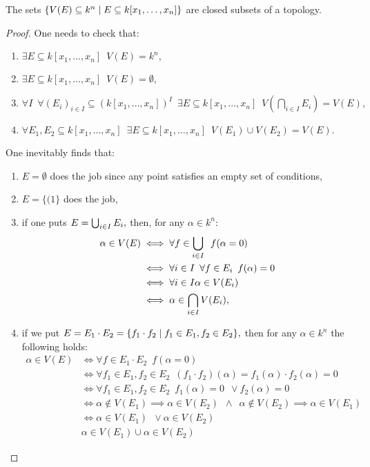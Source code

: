 \begin{lemma}
  \label{zariski algebraic sets}
  The sets
  \(\{V(E) \subseteq k^n \mathrel{|} E \subseteq k[x_1, \dotsc, x_n]\}\)
  are closed subsets of a topology.
\end{lemma}
\begin{proof}
  One needs to check that:
  \begin{enumerate}
  \item \(\exists E \subseteq k[x_1, \dotsc, x_n] \enspace V(E) = k^n,\)
  \item \(\exists E \subseteq k[x_1, \dotsc, x_n] \enspace V(E) = \emptyset,\)
  \item \(\forall I \enspace \forall (E_i)_{i \in I} \subseteq (k[x_1, \dotsc, x_n])^I \enspace \exists E \subseteq k[x_1, \dotsc, x_n] \enspace V(\bigcap_{i \in I} E_i) = V(E),\)
  \item \(\forall E_1, E_2 \subseteq k[x_1, \dotsc, x_n] \enspace \exists E \subseteq k[x_1, \dotsc, x_n] \enspace V(E_1) \cup V(E_2) = V(E).\)
    \end{enumerate}
  One inevitably finds that:
  \begin{enumerate}
  \item \(E = \emptyset\) does the job since any point satisfies an empty set of conditions,
  \item \(E = \{(1\}\) does the job,
  \item if one puts \(E = \operatorname*{\bigcup}_{i \in I} E_i,\)
    then, for any \(\alpha \in k^n:\)
    \begin{align*}
      \alpha \in V(E) & \iff \forall f \in \operatorname*{\bigcup}_{i \in I} \enspace f(\alpha = 0) \\
                      & \iff \forall i \in I \enspace \forall f \in E_i \enspace f(\alpha) = 0 \\
                      & \iff \forall i \in I \alpha \in V(E_i) \\
                      & \iff \alpha \in \operatorname*{\bigcap}_{i \in I} V(E_i),
    \end{align*}
  \item if we put \(E = E_1 \cdot E_2 = \{f_1 \cdot f_2 \mathrel{|} f_1 \in E_1, f_2 \in E_2\},\) then for any \(\alpha \in k^n\) the following holds:
    \begin{align*}
      \alpha \in V(E) & \iff \forall f \in E_1 \cdot E_2 \enspace f(\alpha = 0) \\
                      & \iff \forall f_1 \in E_1, f_2 \in E_2 \enspace (f_1 \cdot f_2)(\alpha) = f_1(\alpha) \cdot f_2(\alpha) = 0 \\
                      & \iff \forall f_1 \in E_1, f_2 \in E_2 \enspace f_1(\alpha) = 0 \enspace \lor f_2(\alpha) = 0 \\
                      & \iff \alpha \notin V(E_1) \implies \alpha \in V(E_2) \enspace \land \enspace \alpha \notin V(E_2) \implies \alpha \in V(E_1) \\
                      & \iff \alpha \in V(E_1) \enspace \lor \alpha \in V(E_2) \\
                      & \alpha \in V(E_1) \cup \alpha \in V(E_2)
    \end{align*}
  \end{enumerate}
\end{proof}


